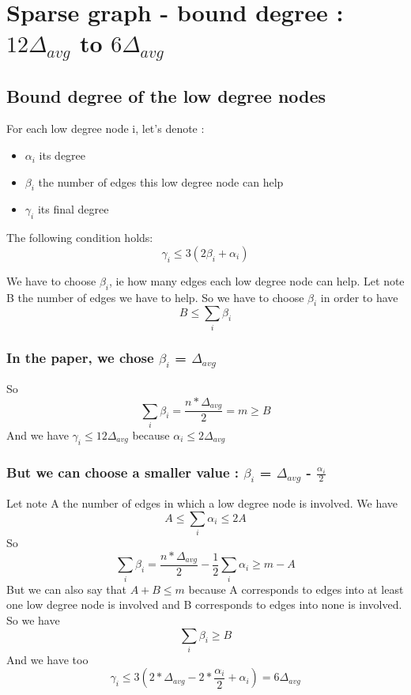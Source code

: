\documentclass{article}
\begin{document}
\section{Sparse graph - bound degree : $12\Delta_{avg}$ to $6\Delta_{avg}$}

\subsection{Bound degree of the low degree nodes}

For each low degree node i, let's denote :
\begin{itemize}
    \item $\alpha_i$ its degree
    \item $\beta_i$ the number of edges this low degree node can help
    \item $\gamma_i$ its final degree
\end{itemize}
The following condition holds: $$\gamma_i \leq 3(2\beta_i + \alpha_i)$$

We have to choose $\beta_i$, ie how many edges each low degree node
can help. Let note B the number of edges we have to help.
So we have to choose $\beta_i$ in order to have $$B \leq \sum_{i} \beta_i$$

\subsubsection{In the paper, we chose $\beta_i$ = $\Delta_{avg}$}

So $$\sum_{i} \beta_i = \frac{n*\Delta_{avg}}{2} = m \geq B$$
And we have $\gamma_i \leq 12\Delta_{avg}$ because $\alpha_i \leq 2\Delta_{avg}$

\subsubsection{But we can choose a smaller value : $\beta_i$ = $\Delta_{avg}$ - $\frac{\alpha_i}{2}$}

Let note A the number of edges in which a low degree node is involved.
We have $$A \leq \sum_{i} \alpha_i \leq 2A$$
So $$\sum_{i} \beta_i = \frac{n*\Delta_{avg}}{2} - \frac{1}{2}\sum_{i} \alpha_i \geq m - A$$
But we can also say that $ A + B \leq m$ because A corresponds to edges
into at least one low degree node is involved and B corresponds to edges
into none is involved. So we have $$\sum_{i} \beta_i \geq B$$
And we have too
$$\gamma_i \leq 3(2*\Delta_{avg}-2*\frac{\alpha_i}{2}+\alpha_i) = 6\Delta_{avg}$$
\end{document}
